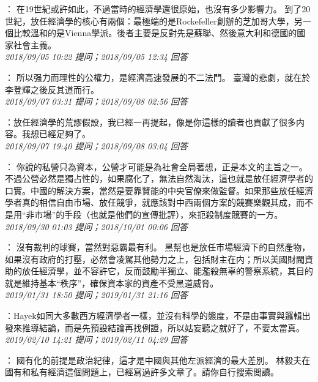 \documentclass[twocolumn]{ctexart}
\begin{document}
：
在19世紀或許如此，不過當時的經濟學還很原始，也沒有多少影響力。
到了20世紀，放任經濟學的核心有兩個：最極端的是Rockefeller創辦的芝加哥大學，另一個比較溫和的是Vienna學派。後者主要是反對先是蘇聯、然後意大利和德國的國家社會主義。
\\

\textit{\hfill\noindent\small 2018/09/05 10:22 提问；2018/09/05 12:34 回答}

：
所以强力而理性的公權力，是經濟高速發展的不二法門。
臺灣的悲劇，就在於李登輝之後反其道而行。
\\

\textit{\hfill\noindent\small 2018/09/07 03:31 提问；2018/09/08 02:56 回答}

：放任經濟學的荒謬假設，我已經一再提起，像是你這樣的讀者也貢獻了很多内容。我想已經足夠了。
\\

\textit{\hfill\noindent\small 2018/09/07 19:40 提问；2018/09/08 03:04 回答}

：
你說的私營只為資本，公營才可能是為社會全局著想，正是本文的主旨之一。
不過公營必然是獨占性的，如果腐化了，無法自然淘汰，這也就是放任經濟學者的口實。中國的解決方案，當然是要靠賢能的中央官僚來做監督。如果那些放任經濟學者真的相信自由市場、放任競爭，就應該對中西兩個方案的競賽樂觀其成，而不是用“非市場”的手段（也就是他們的宣傳批評），來扼殺制度競賽的一方。
\\

\textit{\hfill\noindent\small 2018/09/30 01:03 提问；2018/10/01 00:06 回答}

：
沒有裁判的球賽，當然對惡霸最有利。
黑幫也是放任市場經濟下的自然產物，如果沒有政府的打壓，必然會凌駕其他勢力之上，包括財主在内；所以美國財閥資助的放任經濟學，並不容許它，反而鼓勵半獨立、能濫殺無辜的警察系統，其目的就是維持基本“秩序”，確保資本家的資產不受黑道威脅。
\\

\textit{\hfill\noindent\small 2019/01/31 18:50 提问；2019/01/31 21:16 回答}

：Hayek如同大多數西方經濟學者一樣，並沒有科學的態度，不是由事實與邏輯出發來推導結論，而是先預設結論再找例證，所以姑妄聽之就好了，不要太當真。
\\

\textit{\hfill\noindent\small 2019/02/10 14:21 提问；2019/02/11 04:29 回答}

：
國有化的前提是政治紀律，這才是中國與其他左派經濟的最大差別。
林毅夫在國有和私有經濟這個問題上，已經寫過許多文章了。請你自行搜索閲讀。
\\
\end{document}
